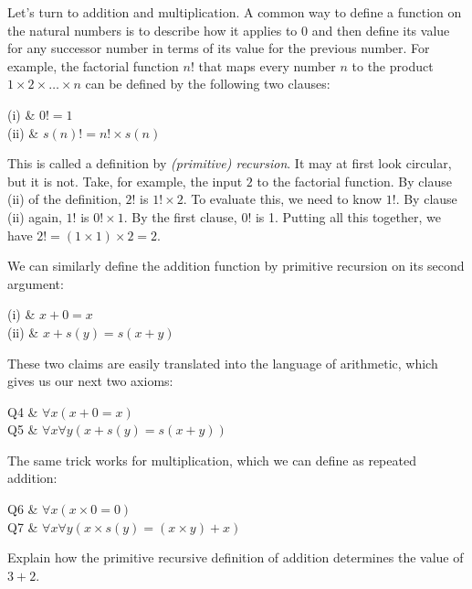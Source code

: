 Let's turn to addition and multiplication.
A common way to define a function on the natural numbers is to
describe how it applies to 0
and then define its value for any successor number
in terms of its value for the previous number.
For example,
the factorial function $n!$ that maps every number $n$ to
the product $1 \times 2 \times \ldots \times n$ can be defined by
the following two clauses:

\begin{axioms}
 (i) & $0! = 1$\\
 (ii) & $s(n)! = n! \times s(n)$
\end{axioms}

This is called a definition by \emph{(primitive) recursion}.
It may at first look circular,
but it is not.
Take,
for example, the input $2$ to the factorial function.
By clause (ii) of the definition,
$2!$ is $1! \times 2$.
To evaluate this,
we need to know $1!$.
By clause (ii) again,
$1!$ is $0! \times 1$.
By the first clause,
$0!$ is 1.
Putting all this together,
we have $2! = (1 \times 1) \times 2 = 2$.

We can similarly define the addition function by primitive recursion on its second argument:

\begin{axioms}
(i) &  $x + 0 = x$\\
(ii) &  $x + s(y) = s(x + y)$
\end{axioms}

These two claims are easily translated into the language of arithmetic,
which gives us our next two axioms:

\begin{axioms}
  Q4 & $\forall x (x + 0 = x)$ \\
  Q5 & $\forall x \forall y (x + s(y) = s(x + y))$
\end{axioms}

The same trick works for multiplication,
which we can define as repeated addition:

\begin{axioms}
  Q6 & $\forall x (x \times 0 = 0)$ \\
  Q7 & $\forall x \forall y (x \times s(y) = (x \times y) + x)$
\end{axioms}

\vspace{-\baselineskip}
\begin{exercise}
  Explain how the primitive recursive definition of addition determines the value of $3 + 2$.
\end{exercise}

